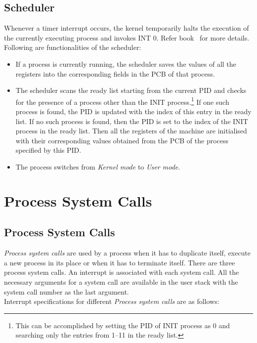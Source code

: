 \documentclass[11pt]{report}
\newcounter{syscall}
\begin{document}
\section{Scheduler}
\label{chp:scheduler}
Whenever a timer interrupt occurs, the kernel temporarily halts the execution of the currently executing process and invokes INT 0.
Refer book~\cite{Crowley} for more details.
Following are functionalities of the scheduler:
\begin{itemize}
	\item If a process is currently running, the scheduler saves the values of all the registers into the corresponding fields in the PCB of that process.
	\item The scheduler scans the ready list starting from the current PID and checks for the presence of a process other than the INIT process.\footnote{This can be accomplished by setting the PID of INIT process as 0 and searching only the entries from 1--11 in the ready list.} If one such process is found, the PID is updated with the index of this entry in the ready list. If no such process is found, then the PID is set to the index of the INIT process in the ready list. Then all the registers of the machine are initialised with their corresponding values obtained from the PCB of the process specified by this PID.
	\item The process switches from \textit{Kernel mode} to \textit{User mode}.
\end{itemize}

\chapter{Process System Calls}
\label{chp:process_system_calls}

\section{Process System Calls}
\label{procsyscall}
\textit{Process system calls} are used by a process when it has to duplicate itself, execute a new process in its place or when it has to terminate itself. There are three process system calls. An interrupt is associated with each system call. All the necessary arguments for a system call are available in the user stack with the system call number as the last argument.\\

\noindent Interrupt specifications for different \textit{Process system calls} are as follows:
\end{document}
